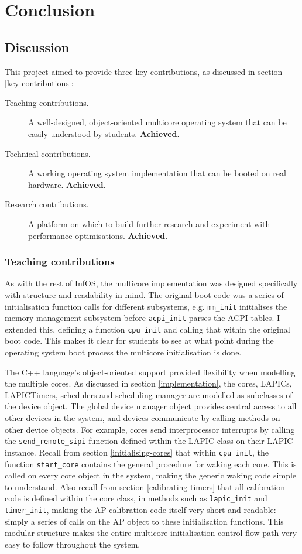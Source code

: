 \documentclass[bsc,frontabs,singlespacing,parskip,deptreport]{infthesis}
\begin{document}
\chapter{Conclusion}
\section{Discussion}
This project aimed to provide three key contributions, as discussed in section \ref{key-contributions}:
\begin{description}
    \item [Teaching contributions.] A well-designed, object-oriented multicore operating system that can be easily understood by students. \textbf{Achieved}.
    \item [Technical contributions.] A working operating system implementation that can be booted on real hardware. \textbf{Achieved}.
    \item [Research contributions. ] A platform on which to build further research and experiment with performance optimisations. \textbf{Achieved}.
\end{description}

\subsection{Teaching contributions}
As with the rest of InfOS, the multicore implementation was designed specifically with structure and readability in mind. The original boot code was a series of initialisation function calls for different subsystems, e.g. \verb|mm_init| initialises the memory management subsystem before \verb|acpi_init| parses the ACPI tables. I extended this, defining a function \verb|cpu_init| and calling that within the original boot code. This makes it clear for students to see at what point during the operating system boot process the multicore initialisation is done.

The C++ language's object-oriented support provided flexibility when modelling the multiple cores. As discussed in section \ref{implementation}, the cores, LAPICs, LAPICTimers, schedulers and scheduling manager are modelled as subclasses of the device object. The global device manager object provides central access to all other devices in the system, and devices communicate by calling methods on other device objects. For example, cores send interprocessor interrupts by calling the \verb|send_remote_sipi| function defined within the LAPIC class on their LAPIC instance. Recall from section \ref{initialising-cores} that within \verb|cpu_init|, the function \verb|start_core| contains the general procedure for waking each core. This is called on every core object in the system, making the generic waking code simple to understand. Also recall from section \ref{calibrating-timers} that all calibration code is defined within the core class, in methods such as \verb|lapic_init| and \verb|timer_init|, making the AP calibration code itself very short and readable: simply a series of calls on the AP object to these initialisation functions. This modular structure makes the entire multicore initialisation control flow path very easy to follow throughout the system.
\end{document}
